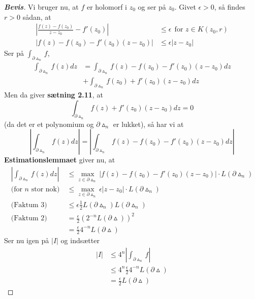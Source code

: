 \documentclass[10pt,a4paper]{article}
\theoremstyle{definition}
\begin{document}
\begin{proof}[\textbf{Bevis}]
Vi bruger nu, at $f$ er holomorf i $z_0$ og ser på $z_0$. Givet $\epsilon > 0$, så findes $r > 0$ sådan, at
\begin{align*}
\left| \frac{f(z) - f(z_0)}{z-z_0} - f'(z_0) \right| &\leq \epsilon  \ \ \text{for } z \in K(z_0,r) \\
\left| f(z) - f(z_0) - f'(z_0)(z-z_0) \right| &\leq \epsilon \left| z-z_0 \right|
\end{align*}
Ser på $\int_{\partial \vartriangle_n} f$,
\begin{align*}
\int_{\partial \vartriangle_n} f(z) dz &= \int_{\partial \vartriangle_n} f(z) - f(z_0) - f'(z_0)(z-z_0)dz \\
&+ \int_{\partial \vartriangle_n} f(z_0) + f'(z_0) (z-z_0) dz
\end{align*}
Men da giver \textbf{sætning 2.11}, at
$$\int_{\partial \vartriangle_n} f (z) + f'(z_0)(z-z_0) dz = 0$$
(da det er et polynomium og $\partial \vartriangle_n$ er lukket), så har vi at
$$\left| \int_{\partial \vartriangle_n} f (z) dz \right| = \left| \int_{\partial  \vartriangle_n} f(z) - f(z_0)-f'(z_0)(z-z_0)dz \right|$$
\textbf{Estimationslemmaet} giver nu, at
\begin{align*}
\left| \int_{\partial \vartriangle_n} f(z) dz \right| &\leq \max_{z \in \partial \vartriangle_n} \left| f(z)-f(z_0) - f'(z_0)(z-z_0) \right| \cdot L(\partial \vartriangle_n) \\
\text{(for }n\text{ stor nok)} \ &\leq  \max_{z \in \partial \vartriangle_n} \epsilon \left| z- z_0 \right| \cdot L(\partial \vartriangle_n) \\
\text{(Faktum 3) } &\leq \epsilon \frac{1}{2} L(\partial \vartriangle_n) L(\partial \vartriangle_n) \\
\text{(Faktum 2) } &= \frac{\epsilon}{2} (2^{-n} L(\partial \vartriangle))^2 \\
&= \frac{\epsilon}{2} 4^{-n} L (\partial \vartriangle)
\end{align*}
Ser nu igen på $\left| I \right|$ og indsætter
\begin{align*}
 \left| I \right| &\leq 4^n \left| \int_{\partial \vartriangle_n} f \right| \\
 &\leq 4^n \frac{\epsilon}{2} 4^{-n} L(\partial \vartriangle) \\
 &= \frac{\epsilon}{2} L(\partial \vartriangle)
\end{align*}
\end{proof}
\end{document}
